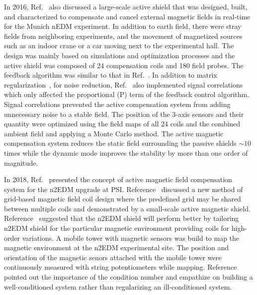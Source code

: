 In 2016, Ref.~\cite{lins} also discussed a large-scale active shield that was designed, built, and characterized to compensate and cancel external magnetic fields in real-time for the Munich nEDM experiment. In addition to earth field, there were stray fields from neighboring experiments, and the movement of magnetized sources such as an indoor crane or a car moving next to the experimental hall. The design was mainly based on simulations and optimization processes and the active shield was composed of 24 compensation coils and 180 field probes. The feedback algorithm was similar to that in Ref.~\cite{bea}. In addition to matrix regularization~\cite{bea}, for noise reduction, Ref.~\cite{lins} also implemented signal correlations which only affected the proportional (P) term of the feedback control algorithm. Signal correlations prevented the active compensation system from adding unnecessary noise to a stable field. The position of the 3-axis sensors and their quantity were optimized using the field maps of all 24 coils and the combined ambient field and applying a Monte Carlo method. The active magnetic compensation system reduces the static field surrounding the passive shields $\sim10$ times while the dynamic mode improves the stability by more than one order of magnitude.


In 2018, Ref.~\cite{rawlik} presented the concept of active magnetic field compensation system for the n2EDM upgrade at PSI. Reference~\cite{rawlik} discussed a new method of grid-based magnetic field coil design where the predefined grid may be shared between multiple coils and demonstrated by a small-scale active magnetic shield.   Reference~\cite{rawlik} suggested that the n2EDM shield will perform better by tailoring  n2EDM shield for the particular magnetic environment providing coils for high-order variations. A mobile tower with magnetic sensors was build to map the magnetic environment at the n2EDM experimental site. The position and orientation of the magnetic senors attached with the mobile tower were continuously measured with string potentiometers while mapping. Reference~\cite{rawlik} pointed out the importance of the condition number and empathize on building a well-conditioned system rather than regularizing an ill-conditioned system.




